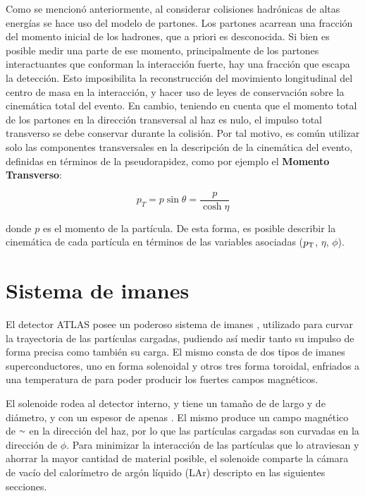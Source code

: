 
Como se mencionó anteriormente, al considerar colisiones hadrónicas de altas energías se hace uso del modelo de partones. Los partones acarrean una fracción del momento inicial de los hadrones, que a priori es desconocida. Si bien es posible medir una parte de ese momento, principalmente de los partones interactuantes que conforman la interacción fuerte, hay una fracción que escapa la detección. Esto imposibilita la reconstrucción del movimiento longitudinal del centro de masa en la interacción, y hacer uso de leyes de conservación sobre la cinemática total del evento. En cambio, teniendo en cuenta que el momento total de los partones en la dirección transversal al haz es nulo, el impulso total transverso se debe conservar durante la colisión. Por tal motivo, es común utilizar solo las componentes transversales en la descripción de la cinemática del evento, definidas en términos de la pseudorapidez, como por ejemplo el \textbf{Momento Transverso}:

\begin{equation}
p_{T}=p\sin\theta=\frac{p}{\cosh{\eta}}
\end{equation}

\noindent
donde $p$ es el momento de la partícula. De esta forma, es posible describir la cinemática de cada partícula en términos de las variables asociadas ($p_{\text{T}}$, $\eta$, $\phi$).

\section{Sistema de imanes}

El detector ATLAS posee un poderoso sistema de imanes \cite{tenKate:409763}, utilizado para curvar la trayectoria de las partículas cargadas, pudiendo así medir tanto su impulso de forma precisa como también su carga. El mismo consta de dos tipos de imanes superconductores, uno en forma solenoidal y otros tres forma toroidal, enfriados a una temperatura de  para poder producir los fuertes campos magnéticos.

El solenoide rodea al detector interno, y tiene un tamaño de  de largo y  de diámetro, 
y con un espesor de apenas . El mismo produce un campo magnético de {$\smallsim$} en la dirección del haz, por lo que las partículas cargadas son curvadas en la dirección de $\phi$. Para minimizar la interacción de las partículas que lo atraviesan y ahorrar la mayor cantidad de material posible, el solenoide comparte la cámara de vacío del calorímetro de argón líquido (LAr) descripto en las siguientes secciones.

